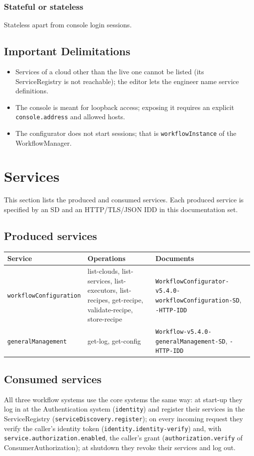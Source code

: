 \documentclass[a4paper]{arrowhead}
\begin{document}
\subsubsection{Stateful or stateless}
Stateless apart from console login sessions.

\subsection{Important Delimitations}
\label{sec:delimitations}
\begin{itemize}
\item Services of a cloud other than the live one cannot be listed (its ServiceRegistry is not reachable); the editor lets
the engineer name service definitions.
\item The console is meant for loopback access; exposing it requires an explicit \texttt{console.address} and allowed
hosts.
\item The configurator does not start sessions; that is \texttt{workflowInstance} of the WorkflowManager.
\end{itemize}

\newpage
\section{Services}
\label{sec:services}
This section lists the produced and consumed services. Each produced service is specified by an SD and an HTTP/TLS/JSON
IDD in this documentation set.

\subsection{Produced services}

{\small
\begin{longtable}{|p{3.8cm}|p{6.2cm}|p{5.8cm}|}

\hline
\rowcolor{gray!33} Service & Operations & Documents \\ \hline
\endhead
\texttt{workflowConfiguration} & list-clouds, list-services, list-executors, list-recipes, get-recipe, validate-recipe, store-recipe & \texttt{WorkflowConfigurator-v5.4.0-workflowConfiguration-SD}, \texttt{-HTTP-IDD} \\ \hline
\texttt{generalManagement} & get-log, get-config & \texttt{Workflow-v5.4.0-generalManagement-SD}, \texttt{-HTTP-IDD} \\ \hline
\end{longtable}
}


\subsection{Consumed services}
All three workflow systems use the core systems the same way: at start-up they log in at the Authentication
system (\texttt{identity}) and register their services in the ServiceRegistry (\texttt{serviceDiscovery.register});
on every incoming request they verify the caller's identity token (\texttt{identity.identity-verify}) and, with
\texttt{service.authorization.enabled}, the caller's grant (\texttt{authorization.verify} of ConsumerAuthorization);
at shutdown they revoke their services and log out.
\end{document}
